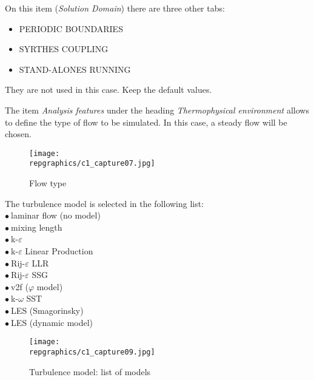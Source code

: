 On this item ({\itshape Solution Domain}) there are three other tabs:
\begin{itemize}
        \item PERIODIC BOUNDARIES
        \item SYRTHES COUPLING
        \item STAND-ALONES RUNNING
\end{itemize}
They are not used in this case. Keep the default values.

\clearpage
The item {\itshape Analysis features} under the heading {\itshape Thermophysical
environment} allows to define the type of flow to be simulated. In this case, a
steady flow will be chosen.

\begin{figure}[ht]
\begin{center}
\texttt{[image: \\repgraphics/c1\_capture07.jpg]}
\caption{Flow type}
\label{fig7_e1}
\end{center}
\end{figure}


\clearpage
The turbulence model is selected in the following list:\\
\hspace*{1cm}$\bullet\ $laminar flow (no model)\\
\hspace*{1cm}$\bullet\ $mixing length\\
\hspace*{1cm}$\bullet\ $k-$\varepsilon$\\
\hspace*{1cm}$\bullet\ $k-$\varepsilon$ Linear Production\\
\hspace*{1cm}$\bullet\ $Rij-$\varepsilon$ LLR\\
\hspace*{1cm}$\bullet\ $Rij-$\varepsilon$ SSG\\
\hspace*{1cm}$\bullet\ $v2f ($\varphi$ model)\\
\hspace*{1cm}$\bullet\ $k-$\omega$ SST\\
\hspace*{1cm}$\bullet\ $LES (Smagorinsky)\\
\hspace*{1cm}$\bullet\ $LES (dynamic model)

\begin{figure}[ht]
\begin{center}
\texttt{[image: \\repgraphics/c1\_capture09.jpg]}
\caption{Turbulence model: list of models}
\label{fig9_e1}
\end{center}
\end{figure}


